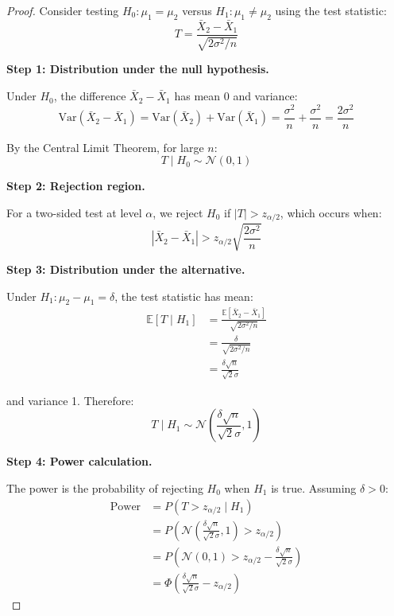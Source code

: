\begin{proof}
Consider testing $H_0: \mu_1 = \mu_2$ versus $H_1: \mu_1 \neq \mu_2$ using the test statistic:
\begin{equation}
T = \frac{\bar{X}_2 - \bar{X}_1}{\sqrt{2\sigma^2/n}}
\end{equation}

\textbf{Step 1: Distribution under the null hypothesis.}

Under $H_0$, the difference $\bar{X}_2 - \bar{X}_1$ has mean 0 and variance:
\begin{equation}
\text{Var}(\bar{X}_2 - \bar{X}_1) = \text{Var}(\bar{X}_2) + \text{Var}(\bar{X}_1) = \frac{\sigma^2}{n} + \frac{\sigma^2}{n} = \frac{2\sigma^2}{n}
\end{equation}

By the Central Limit Theorem, for large $n$:
\begin{equation}
T \mid H_0 \sim \mathcal{N}(0, 1)
\end{equation}

\textbf{Step 2: Rejection region.}

For a two-sided test at level $\alpha$, we reject $H_0$ if $|T| > z_{\alpha/2}$, which occurs when:
\begin{equation}
|\bar{X}_2 - \bar{X}_1| > z_{\alpha/2} \sqrt{\frac{2\sigma^2}{n}}
\end{equation}

\textbf{Step 3: Distribution under the alternative.}

Under $H_1: \mu_2 - \mu_1 = \delta$, the test statistic has mean:
\begin{align}
\mathbb{E}[T \mid H_1] &= \frac{\mathbb{E}[\bar{X}_2 - \bar{X}_1]}{\sqrt{2\sigma^2/n}} \\
&= \frac{\delta}{\sqrt{2\sigma^2/n}} \\
&= \frac{\delta\sqrt{n}}{\sqrt{2}\sigma}
\end{align}

and variance 1. Therefore:
\begin{equation}
T \mid H_1 \sim \mathcal{N}\left(\frac{\delta\sqrt{n}}{\sqrt{2}\sigma}, 1\right)
\end{equation}

\textbf{Step 4: Power calculation.}

The power is the probability of rejecting $H_0$ when $H_1$ is true. Assuming $\delta > 0$:
\begin{align}
\text{Power} &= P(T > z_{\alpha/2} \mid H_1) \\
&= P\left(\mathcal{N}\left(\frac{\delta\sqrt{n}}{\sqrt{2}\sigma}, 1\right) > z_{\alpha/2}\right) \\
&= P\left(\mathcal{N}(0,1) > z_{\alpha/2} - \frac{\delta\sqrt{n}}{\sqrt{2}\sigma}\right) \\
&= \Phi\left(\frac{\delta\sqrt{n}}{\sqrt{2}\sigma} - z_{\alpha/2}\right)
\end{align}


\end{proof}
